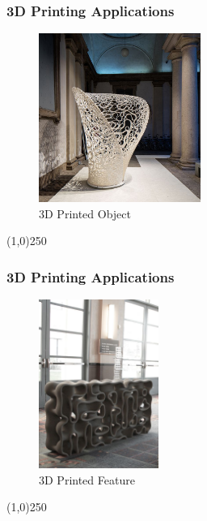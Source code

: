 \begin{frame}
\frametitle{3D Printing Applications}
\begin{figure}[h]
	\centering
	\includegraphics[height=5.5cm]{img/3DPrinting/3dprintedObject.jpg}
	\caption[3D Printed Object]{3D Printed Object}
	\label{fig:3dprintObject}
\end{figure}
\end{frame}
\begin{center}\line(1,0){250}\end{center}

\begin{frame}
\frametitle{3D Printing Applications}
\begin{figure}[h]
	\centering
	\includegraphics[height=5.5cm]{img/3DPrinting/3dprintFeature.jpg}
	\caption[3D Printed Feature]{3D Printed Feature}
	\label{fig:3dprintFeature}
\end{figure}
\end{frame}
\begin{center}\line(1,0){250}\end{center}


